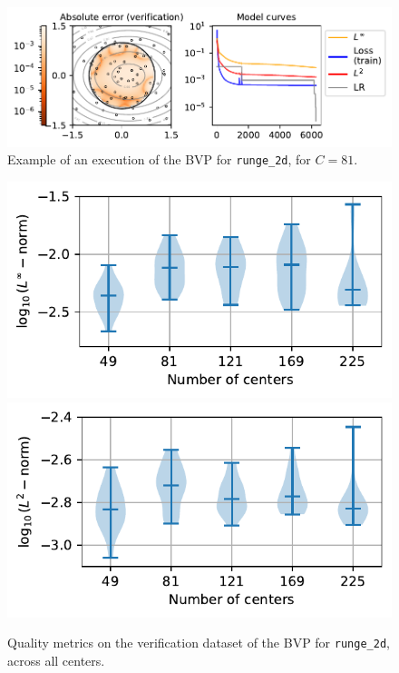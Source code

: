\documentclass[12pt]{report} %
\begin{document}
\begin{figure}
  \includegraphics[width=\textwidth]{imagenes/experiments/2d/pde_runge_2d/runge_2d-TR15-C81-rrrrepetishon-E6270.pdf}
  \caption{Example of an execution of the BVP for \texttt{runge\_2d}, for $C=81$.}
  \label{fig:example-execution-runge-2d-pde}
\end{figure}



\begin{figure}
  \includegraphics[width=.45\textwidth]{imagenes/experiments/2d/pde_runge_2d/violins_linf_runge_2d_endgame.pdf}
  \includegraphics[width=.45\textwidth]{imagenes/experiments/2d/pde_runge_2d/violins_l2_runge_2d_endgame.pdf}
  \caption{Quality metrics on the verification dataset of the BVP for \texttt{runge\_2d}, across all centers.}
  \label{fig:violins-runge-pde-2d}
\end{figure}
\end{document}
